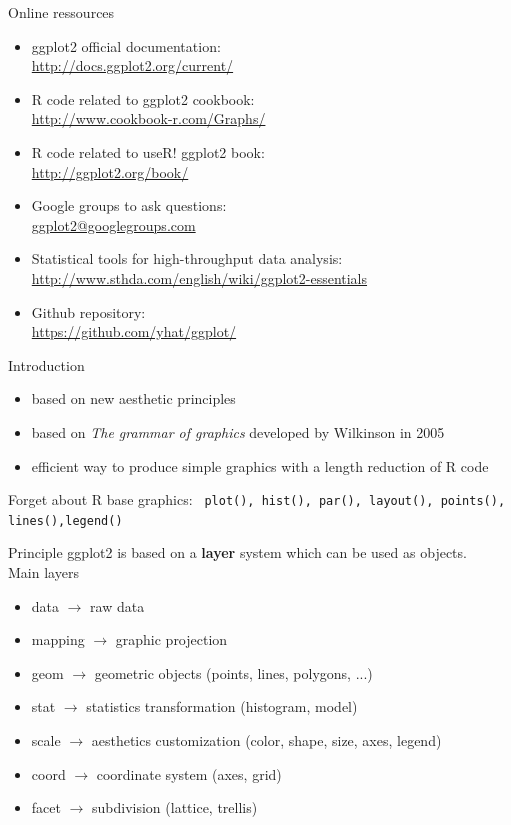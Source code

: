 \documentclass{beamer}\usepackage[]{graphicx}\usepackage[]{color}
\begin{document}
\begin{frame}{Online ressources}
\begin{itemize}
\item ggplot2 official documentation:\\  \url{http://docs.ggplot2.org/current/}
\item R code related to ggplot2 cookbook:\\ \url{http://www.cookbook-r.com/Graphs/}
\item R code related to useR! ggplot2 book:\\ \url{http://ggplot2.org/book/}
\item Google groups to ask questions:\\ \url{ggplot2@googlegroups.com}
\item Statistical tools for high-throughput data analysis:\\ \url{http://www.sthda.com/english/wiki/ggplot2-essentials}
\item Github repository:\\ \url{https://github.com/yhat/ggplot/}
\end{itemize}
\end{frame}


\begin{frame}{Introduction}
\begin{itemize}
\item based on new aesthetic principles
\item based on \textit{The grammar of graphics} developed by Wilkinson in 2005
\item efficient way to produce simple graphics with a length reduction of R code
\end{itemize}

\begin{alertblock}{Forget about R base graphics:}
\texttt{ plot(), hist(), par(), layout(), points(), lines(),legend()}
\end{alertblock}
\end{frame}

\begin{frame}{Principle}
ggplot2 is based on a \textbf{layer} system which can be used as objects.\\
\vspace{1cm}
Main layers
\begin{itemize}
\item data $\rightarrow$ raw data
\item mapping $\rightarrow$ graphic projection
\item geom $\rightarrow$ geometric objects (points, lines, polygons, ...)
\item stat $\rightarrow$ statistics transformation (histogram, model)
\item scale $\rightarrow$ aesthetics customization (color, shape, size, axes, legend)
\item coord $\rightarrow$ coordinate system (axes, grid)
\item facet $\rightarrow$ subdivision (lattice, trellis)
\end{itemize}
\end{frame}
\end{document}
